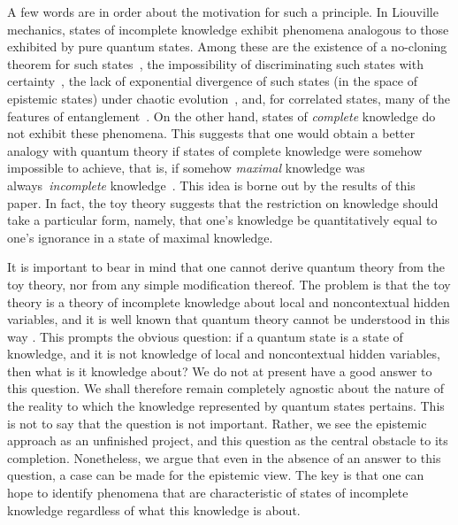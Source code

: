 \documentclass[pra,nofootinbib,showpacs,12pt]{revtex4}
\begin{document}
A few words are in order about the motivation for such a principle. In
Liouville mechanics, states of incomplete knowledge exhibit phenomena
analogous to those exhibited by pure quantum states. Among these are the
existence of a no-cloning theorem for such states~\cite%
{Fuchscloning,classicalnocloning}, the impossibility of discriminating such
states with certainty~\cite{Fuchscloning,RudolphSpekkens03}, the lack of
exponential divergence of such states (in the space of epistemic states)
under chaotic evolution~\cite{Ballentinechaos}, and, for correlated states,
many of the features of entanglement~\cite{Col01}. On the other hand, states
of \emph{complete} knowledge do not exhibit these phenomena. This suggests
that one would obtain a better analogy with quantum theory if states of
complete knowledge were somehow impossible to achieve, that is, if somehow
\emph{maximal} knowledge was always\emph{\ incomplete} knowledge~\cite%
{Fuchscloning,FCS,Fuchssamizdat}. This idea is borne out by the results of
this paper. In fact, the toy theory suggests that the restriction on
knowledge should take a particular form, namely, that one's knowledge be
quantitatively equal to one's ignorance in a state of maximal knowledge.

It is important to bear in mind that one cannot derive quantum theory from
the toy theory, nor from any simple modification thereof. The problem is
that the toy theory is a theory of incomplete knowledge about local and
noncontextual hidden variables, and it is well known that quantum theory
cannot be understood in this way \cite{Bell,KochenSpecker,Bell2}. This
prompts the obvious question: if a quantum state is a state of knowledge,
and it is not knowledge of local and noncontextual hidden variables, then
what is it knowledge about? We do not at present have a good answer to this
question. We shall therefore remain completely agnostic about the nature of
the reality to which the knowledge represented by quantum states pertains.
This is not to say that the question is not important. Rather, we see the
epistemic approach as an unfinished project, and this question as the
central obstacle to its completion. Nonetheless, we argue that even in the
absence of an answer to this question, a case can be made for the epistemic
view. The key is that one can hope to identify phenomena that are
characteristic of states of incomplete knowledge regardless of what this
knowledge is about.
\end{document}
